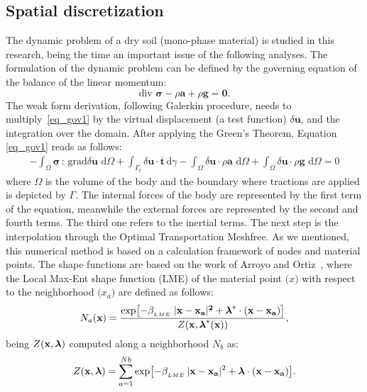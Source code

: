 \documentclass[applsci,journal,article,submit,moreauthors,pdftex]{Definitions/mdpi}
\newcommand{\differential}[1]
{\mathrm{d}#1}
\begin{document}
\subsection{Spatial discretization}
The dynamic problem of a dry soil (mono-phase material) is studied in this research, being the time an important issue of the following analyses. The formulation of the dynamic problem can be defined by the governing equation of the balance of the linear momentum:
\begin{equation}\label{eq_gov1}
 \mbox{div } \boldsymbol{\sigma}-\rho\boldsymbol{a}+\rho\boldsymbol{g}=\boldsymbol{0}.
\end{equation}
The weak form derivation, following Galerkin procedure, needs to multiply~\eqref{eq_gov1} by the virtual displacement (a test function) $\delta \boldsymbol{u}$, and the integration over the domain. After applying the Green's Theorem, Equation \eqref{eq_gov1} reads as follows:
\begin{eqnarray} \label{eq_gov1_a}
-\int_\Omega \boldsymbol{ \sigma} \, : \, \mbox{grad} \delta\boldsymbol{u} \,\, \differential{\Omega} + \int_{\Gamma_{t}} \delta\boldsymbol{u} \cdot\boldsymbol{\overline{t}} \, \differential \gamma - \int_\Omega \delta\boldsymbol{u} \cdot  \rho\boldsymbol{a}  \,\, \differential{\Omega} + \int_\Omega \delta\boldsymbol{u} \cdot 
\rho\boldsymbol{g}  \,\, \differential{\Omega}= 0 
\end{eqnarray}
where $\Omega$ is the volume of the body and the boundary where tractions are applied is depicted by $\Gamma$. The internal forces of the body are represented by the first term of the equation, meanwhile the external forces are represented by the second and fourth terms. The third one refers to the inertial terms. The next step is the interpolation through the Optimal Transportation Meshfree. As we mentioned, this numerical method is based on a calculation framework of nodes and material points. The shape functions are based on the work of Arroyo and Ortiz~\cite{arroyo2006}, where the Local Max-Ent shape function (LME) of the material point $\boldsymbol(x)$ with respect to the neighborhood $\boldsymbol(x_a)$ are defined as follows:
\begin{equation} \label{eq_N1}
N_a(\textbf{x})=\frac{\exp\left[ -\beta_{_{LME}} \; |\bf{x-x_a}|^2 +  \boldsymbol{\lambda}^*  \cdot  (x-x_a)  \right] } {Z(\textbf{x},\boldsymbol{\lambda}^*(\textbf{x}))},
\end{equation}
being $Z({\bf x}, {\boldsymbol{\lambda}})$ computed along a neighborhood $N_b$ as:
\begin{equation}\label{eq_N2}
Z({\bf x}, {\boldsymbol{\lambda}}) = \sum_{a=1}^{Nb} \exp \left[ -\beta_{_{LME}} \, |{\bf x-x_a}|^2 + \boldsymbol{\lambda}  \cdot  {\bf(x-x_a)}         \right].
\end{equation}
\end{document}
